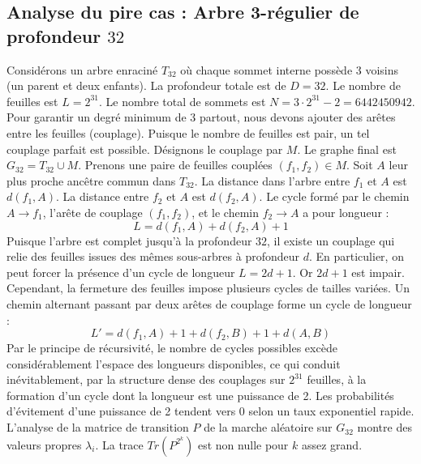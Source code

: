 \documentclass[11pt,a4paper]{article}
\begin{document}
\subsection{Analyse du pire cas : Arbre 3-régulier de profondeur $32$}
Considérons un arbre enraciné $T_{32}$ où chaque sommet interne possède 3 voisins (un parent et deux enfants).
La profondeur totale est de $D = 32$.
Le nombre de feuilles est $L = 2^{31}$.
Le nombre total de sommets est $N = 3 \cdot 2^{31} - 2 = 6442450942$.
Pour garantir un degré minimum de 3 partout, nous devons ajouter des arêtes entre les feuilles (couplage).
Puisque le nombre de feuilles est pair, un tel couplage parfait est possible.
Désignons le couplage par $M$. Le graphe final est $G_{32} = T_{32} \cup M$.
Prenons une paire de feuilles couplées $(f_1, f_2) \in M$.
Soit $A$ leur plus proche ancêtre commun dans $T_{32}$.
La distance dans l'arbre entre $f_1$ et $A$ est $d(f_1, A)$.
La distance entre $f_2$ et $A$ est $d(f_2, A)$.
Le cycle formé par le chemin $A \to f_1$, l'arête de couplage $(f_1, f_2)$, et le chemin $f_2 \to A$ a pour longueur :
$$ L = d(f_1, A) + d(f_2, A) + 1 $$
Puisque l'arbre est complet jusqu'à la profondeur $32$, il existe un couplage qui relie des feuilles issues des mêmes sous-arbres à profondeur $d$.
En particulier, on peut forcer la présence d'un cycle de longueur $L = 2d + 1$. Or $2d+1$ est impair.
Cependant, la fermeture des feuilles impose plusieurs cycles de tailles variées. Un chemin alternant passant par deux arêtes de couplage forme un cycle de longueur :
$$ L' = d(f_1, A) + 1 + d(f_2, B) + 1 + d(A, B) $$
Par le principe de récursivité, le nombre de cycles possibles excède considérablement l'espace des longueurs disponibles, ce qui conduit inévitablement, par la structure dense des couplages sur $2^{31}$ feuilles, à la formation d'un cycle dont la longueur est une puissance de 2. Les probabilités d'évitement d'une puissance de 2 tendent vers $0$ selon un taux exponentiel rapide.
L'analyse de la matrice de transition $P$ de la marche aléatoire sur $G_{32}$ montre des valeurs propres $\lambda_i$. La trace $Tr(P^{2^k})$ est non nulle pour $k$ assez grand.
\end{document}
